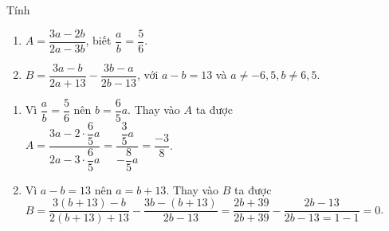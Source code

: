 \begin{bt}%
	Tính
	\begin{enumerate}
		\item $A=\dfrac{3a-2b}{2a-3b}$, biết $\dfrac{a}{b}=\dfrac{5}{6}$.
		\item $B=\dfrac{3a-b}{2a+13}-\dfrac{3b-a}{2b-13}$, với $a-b=13$ và $a\ne -6,5,b\ne 6,5$.
	\end{enumerate}
	\loigiai
	{
		\begin{enumerate}
			\item Vì $\dfrac{a}{b}=\dfrac{5}{6}$ nên $b=\dfrac{6}{5}a$. Thay vào $A$ ta được\\
			$A=\dfrac{3a-2\cdot \dfrac{6}{5}a}{2a-3\cdot \dfrac{6}{5}a} = \dfrac{\dfrac{3}{5}a}{-\dfrac{8}{5}a} = \dfrac{-3}{8}$.
			\item Vì $a-b=13$ nên $a=b+13$. Thay vào $B$ ta được\\
			$B=\dfrac{3(b+13)-b}{2(b+13)+13}-\dfrac{3b-(b+13)}{2b-13} = \dfrac{2b+39}{2b+39} - \dfrac{2b-13}{2b-13=1-1}=0$.
		\end{enumerate}
	}
\end{bt}

